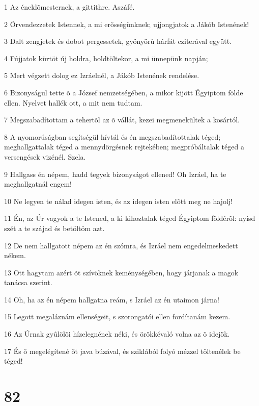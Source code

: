 \par 1 Az éneklõmesternek, a gittithre. Aszáfé.
\par 2 Örvendezzetek Istennek, a mi erõsségünknek; ujjongjatok a Jákób Istenének!
\par 3 Dalt zengjetek és dobot pergessetek, gyönyörû hárfát cziterával együtt.
\par 4 Fújjatok kürtöt új holdra, holdtöltekor, a mi ünnepünk napján;
\par 5 Mert végzett dolog ez Izráelnél, a Jákób Istenének rendelése.
\par 6 Bizonyságul tette õ a József nemzetségében, a mikor kijött Égyiptom földe ellen. Nyelvet hallék ott, a mit nem tudtam.
\par 7 Megszabadítottam a tehertõl az õ vállát, kezei megmenekültek a kosártól.
\par 8 A nyomorúságban segítségül hívtál és én megszabadítottalak téged; meghallgattalak téged a mennydörgésnek rejtekében; megpróbáltalak téged a versengések vizénél. Szela.
\par 9 Hallgass én népem, hadd tegyek bizonyságot ellened! Oh Izráel, ha te meghallgatnál engem!
\par 10 Ne legyen te nálad idegen isten, és az idegen isten elõtt meg ne hajolj!
\par 11 Én, az Úr vagyok a te Istened, a ki kihoztalak téged Égyiptom földérõl: nyisd szét a te szájad és betöltöm azt.
\par 12 De nem hallgatott népem az én szómra, és Izráel nem engedelmeskedett nékem.
\par 13 Ott hagytam azért õt szívöknek keménységében, hogy járjanak a magok tanácsa szerint.
\par 14 Oh, ha az én népem hallgatna reám, s Izráel az én utaimon járna!
\par 15 Legott megaláznám ellenségeit, s szorongatói ellen fordítanám kezem.
\par 16 Az Úrnak gyûlölõi hízelegnének néki, és örökkévaló volna az õ idejök.
\par 17 És õ megelégítené õt java búzával, és sziklából folyó mézzel töltenélek be téged!

\chapter{82}

